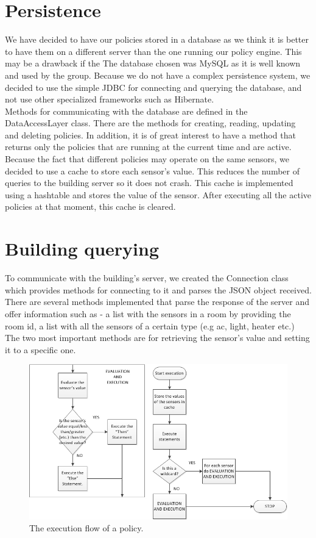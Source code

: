 \section{Persistence}
We have decided to have our policies stored in a database as we think it is better to have them on a different server than the one running our policy engine. This may be a drawback if the The database chosen was MySQL as it is well known and used by the group. Because we do not have a complex persistence system, we decided to use the simple JDBC for connecting and querying the database, and not use other specialized frameworks such as Hibernate. 
\\Methods for communicating with the database are defined in the DataAccessLayer class. There are the methods for creating, reading, updating and deleting policies. In addition, it is of great interest to have a method that returns only the policies that are running at the current time and are active. 
\\Because the fact that different policies may operate on the same sensors, we decided to use a cache to store each sensor's value. This reduces the number of queries to the building server so it does not crash. This cache is implemented using a hashtable and stores the value of the sensor. After executing all the active policies at that moment, this cache is cleared. 
\section{Building querying}
To communicate with the building's server, we created the Connection class which provides methods for connecting to it and parses the JSON object received. There are several methods implemented that parse the response of the server and offer information such as - a list with the sensors in a room by providing the room id, a list with all the sensors of a certain type (e.g ac, light, heater etc.) The two most important methods are for retrieving the sensor's value and setting it to a specific one. 

\begin{figure}
	\centering
    \includegraphics[scale=0.65]{images/policy_execution_flow.png} 
	\caption{The execution flow of a policy.}
	\label{fig:policy_execution_workflow}
\end{figure}

